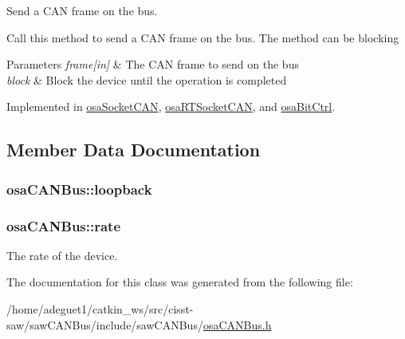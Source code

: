 Send a C\-A\-N frame on the bus. 

Call this method to send a C\-A\-N frame on the bus. The method can be blocking 
\begin{DoxyParams}{Parameters}
{\em frame\mbox{[}in\mbox{]}} & The C\-A\-N frame to send on the bus \\
\hline
{\em block} & Block the device until the operation is completed \\
\hline
\end{DoxyParams}


Implemented in \hyperlink{classosa_socket_c_a_n_a59accc9278f0cbab72e578bb8d486a43}{osa\-Socket\-C\-A\-N}, \hyperlink{classosa_r_t_socket_c_a_n_aa1f62bdadfb3481ca3f96a8152e22508}{osa\-R\-T\-Socket\-C\-A\-N}, and \hyperlink{classosa_bit_ctrl_a8bb8bcf5e56ce2e844dc9d5e5fa01b5c}{osa\-Bit\-Ctrl}.



\subsection{Member Data Documentation}
\hypertarget{classosa_c_a_n_bus_a724e9c478dd48908882e29f189d98968}{
\subsubsection[{loopback}]{ osa\-C\-A\-N\-Bus\-::loopback\hspace{0.3cm}{\ttfamily [protected]}}}\label{classosa_c_a_n_bus_a724e9c478dd48908882e29f189d98968}
\hypertarget{classosa_c_a_n_bus_a4ff86a9ecf19161b1f34666888e0a331}{
\subsubsection[{rate}]{ osa\-C\-A\-N\-Bus\-::rate\hspace{0.3cm}{\ttfamily [protected]}}}\label{classosa_c_a_n_bus_a4ff86a9ecf19161b1f34666888e0a331}


The rate of the device. 



The documentation for this class was generated from the following file\-:\begin{DoxyCompactItemize}
\item 
/home/adeguet1/catkin\-\_\-ws/src/cisst-\/saw/saw\-C\-A\-N\-Bus/include/saw\-C\-A\-N\-Bus/\hyperlink{osa_c_a_n_bus_8h}{osa\-C\-A\-N\-Bus.\-h}\end{DoxyCompactItemize}
